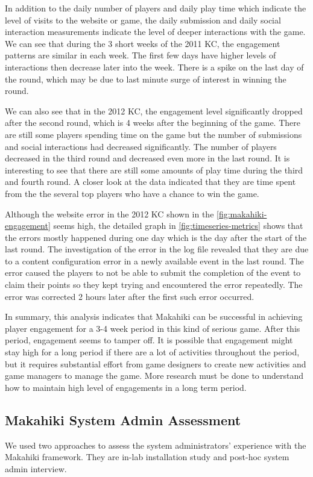 In addition to the daily number of players and daily play time which indicate the level of visits to the website or game, the daily submission and daily social interaction measurements indicate the level of deeper interactions with the game. We can see that during the 3 short weeks of the 2011 KC, the engagement patterns are similar in each week. The first few days have higher levels of interactions then decrease later into the week. There is a spike on the last day of the round, which may be due to last minute surge of interest in winning the round. 

We can also see that in the 2012 KC, the engagement level significantly dropped after the second round, which is 4 weeks after the beginning of the game. There are still some players spending time on the game but the number of submissions and social interactions had decreased significantly. The number of players decreased in the third round and decreased even more in the last round. It is interesting to see that there are still some amounts of play time during the third and fourth round. A closer look at the data indicated that they are time spent from the the several top players who have a chance to win the game. 

Although the website error in the 2012 KC shown in the  \autoref{fig:makahiki-engagement} seems high, the detailed graph in \autoref{fig:timeseries-metrics} shows that the errors mostly happened during one day which is the day after the start of the last round. The investigation of the error in the log file revealed that they are due to a content configuration error in a newly available event in the last round. The error caused the players to not be able to submit the completion of the event to claim their points so they kept trying and encountered the error repeatedly. The error was corrected 2 hours later after the first such error occurred.

In summary, this analysis indicates that Makahiki can be successful in achieving player engagement for a 3-4 week period in this kind of serious game. After this period, engagement seems to tamper off. It is possible that engagement might stay high for a long period if there are a lot of activities throughout the period, but it requires substantial effort from game designers to create new activities and game managers to manage the game. More research must be done to understand how to maintain high level of engagements in a long term period.

\subsection{Makahiki System Admin Assessment}
We used two approaches to assess the system administrators' experience with the Makahiki framework. They are in-lab installation study and post-hoc system admin interview.

